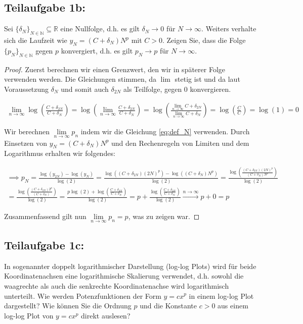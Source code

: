 \documentclass[]{article}
\begin{document}
\subsection*{Teilaufgabe 1b:}
Sei $\{\delta_N\}_{N \in \mathbb{N}} \subseteq \mathbb{R}$ eine Nullfolge, d.h. es gilt $\delta_N \rightarrow 0$ für $N \rightarrow \infty$. Weiters verhalte sich die Laufzeit wie $y_N = (C+\delta_N)N^p$ mit $C > 0$. Zeigen Sie, dass die Folge $\{p_N\}_{N \in \mathbb{N}}$ gegen $p$ konvergiert, d.h. es gilt $p_N \rightarrow p$ für $N \rightarrow \infty$.

\begin{proof}	
	Zuerst berechnen wir einen Grenzwert, den wir in späterer Folge verwenden werden. Die Gleichungen stimmen, da $\lim$ stetig ist und da laut Voraussetzung $\delta_N$ und somit auch $\delta_{2N}$ als Teilfolge, gegen $0$ konvergieren.
	
	\begin{align}
		\lim\limits_{n\rightarrow\infty} \log\left(\frac{C+\delta_{2N}}{C+\delta_N}\right) = \log\left(\lim\limits_{n\rightarrow\infty}\frac{C+\delta_{2N}}{C+\delta_N}\right) = \log\left(\frac{\lim\limits_{n\rightarrow\infty}C+\delta_{2N}}{\lim\limits_{n\rightarrow\infty}C+\delta_N}\right) = \log\left(\frac{C}{C}\right) = \log(1) = 0
	\end{align}

	Wir berechnen $\lim\limits_{n\rightarrow\infty}p_n$ indem wir die Gleichung \ref{eq:def_N} verwenden. Durch Einsetzen von $y_N = (C+\delta_N)N^p$ und den Rechenregeln von Limiten und dem Logarithmus erhalten wir folgendes:

	\begin{align}
		\implies
		p_N = \frac{\log(y_{2N}) - \log(y_N)}{\log(2)} = \frac{\log((C+\delta_{2N})(2N)^p) - \log((C+\delta_N)N^p)}{\log(2)} = \frac{\log\left(\frac{(C+\delta_{2N})(2N)^p}{(C+\delta_N)N^p}\right)}{\log(2)} \\
		= \frac{\log\left(\frac{(C+\delta_{2N})2^p}{(C+\delta_N)}\right)}{\log(2)} = \frac{p \log(2) + \log\left(\frac{C+\delta_{2N}}{C+\delta_N}\right)}{\log(2)} = p + \frac{\log\left(\frac{C+\delta_{2N}}{C+\delta_N}\right)}{\log(2)} \xrightarrow{n\rightarrow\infty} p + 0 = p
	\end{align}
	
	Zusammenfassend gilt nun $\lim\limits_{n\rightarrow\infty}p_n = p$, was zu zeigen war.

\end{proof}

\subsection*{Teilaufgabe 1c:}
In sogenannter doppelt logarithmischer Darstellung (log-log Plots) wird für beide Koordinatenachsen eine logarithmische Skalierung verwendet, d.h. sowohl die waagrechte als auch die senkrechte Koordinatenachse wird logarithmisch unterteilt. Wie werden Potenzfunktionen der Form $y = c x^p$ in einem log-log Plot dargestellt? Wie können Sie die Ordnung $p$ und die Konstante $c > 0$ aus einem log-log Plot von $y = cx^p$ direkt auslesen?
\end{document}
